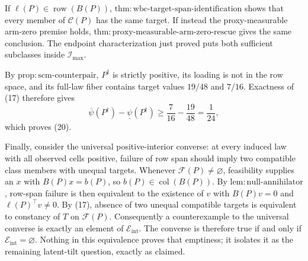 If \(\ell(P)\in\operatorname{row}(B(P))\),
\(\mathrm{thm{:}wbc\text{-}target\text{-}span\text{-}identification}\)
shows that every member of \(\mathcal C(P)\) has the same target.  If instead
the proxy-measurable arm-zero premise holds,
\(\mathrm{thm{:}proxy\text{-}measurable\text{-}arm\text{-}zero\text{-}rescue}\)
gives the same conclusion.  The endpoint characterization just proved puts
both sufficient subclasses inside \(\mathcal I_{\max}\).

By \(\mathrm{prop{:}scm\text{-}counterpair}\), \(P^{\dagger}\) is strictly
positive, its loading is not in the row space, and its full-law fiber contains
target values \(19/48\) and \(7/16\).  Exactness of (17) therefore gives
\[
 \overline\psi(P^{\dagger})-\underline\psi(P^{\dagger})
 \ge \frac7{16}-\frac{19}{48}=\frac1{24},
\]
which proves (20).

Finally, consider the universal positive-interior converse: at every induced
law with all observed cells positive, failure of row span should imply two
compatible class members with unequal targets.  Whenever
\(\mathcal F(P)\ne\varnothing\), feasibility supplies an \(x\) with
\(B(P)x=b(P)\), so \(b(P)\in\operatorname{col}(B(P))\).  By
\(\mathrm{lem{:}null\text{-}annihilator}\), row-span failure is then
equivalent to the existence of \(v\) with
\(B(P)v=0\) and \(\ell(P)^{\top}v\ne0\).  By (17), absence of two unequal
compatible targets is equivalent to constancy of \(T\) on
\(\mathcal F(P)\).  Consequently a counterexample to the universal converse
is exactly an element of \(\mathcal E_{\mathrm{int}}\).  The converse is
therefore true if and only if \(\mathcal E_{\mathrm{int}}=\varnothing\).
Nothing in this equivalence proves that emptiness; it isolates it as the
remaining latent-tilt question, exactly as claimed.